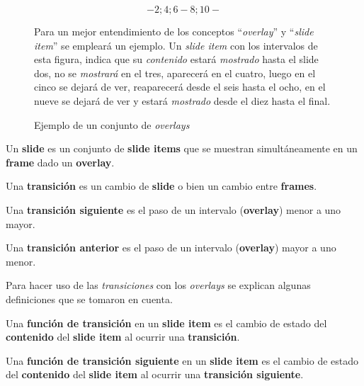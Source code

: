 		\begin{figure}[htb]%
			\centering
			$$-2; 4; 6-8; 10-$$
			\caption{Ejemplo de un conjunto de \textit{overlays}} 
			\label{fig:overlay_set}
			\small

		Para un mejor entendimiento de los conceptos ``\textit{overlay}'' y ``\textit{slide item}'' se empleará un ejemplo. Un \textit{slide item} con los intervalos de esta figura, indica que su \textit{contenido} estará \textit{mostrado} hasta el slide dos, no se \textit{mostrará} en el tres, aparecerá en el cuatro, luego en el cinco se dejará de ver, reaparecerá desde el seis hasta el ocho, en el nueve se dejará de ver y estará \textit{mostrado} desde el diez hasta el final. 			
		\end{figure}

 		\begin{definition}
 		\label{def:slide}
 			Un \textbf{slide} es un conjunto de \textbf{slide items} que se muestran simultáneamente en un \textbf{frame} dado un \textbf{overlay}.
 		\end{definition}

 		\begin{definition}
 		\label{def:transition}
 			Una \textbf{transición} es un cambio de \textbf{slide} o bien un cambio entre \textbf{frames}.
 		\end{definition}

 		\begin{definition}
 		\label{def:next_transition}
 			Una \textbf{transición siguiente} es el paso de un intervalo (\textbf{overlay}) menor a uno mayor.
 		\end{definition} 		

 		\begin{definition}
 		\label{def:prev_transition}
 			Una \textbf{transición anterior} es el paso de un intervalo (\textbf{overlay}) mayor a uno menor.
 		\end{definition}

		Para hacer uso de las \textit{transiciones} con los \textit{overlays} se explican algunas definiciones que se tomaron en cuenta.

		\begin{definition}
		\label{def:transition_func}
			Una \textbf{función de transición} en un \textbf{slide item} es el cambio de estado del \textbf{contenido} del \textbf{slide item} al ocurrir una \textbf{transición}.
		\end{definition}

		\begin{definition}
		\label{def:next_transition_func}
			Una \textbf{función de transición siguiente} en un \textbf{slide item} es el cambio de estado del \textbf{contenido} del \textbf{slide item} al ocurrir una \textbf{transición siguiente}.
		\end{definition}

